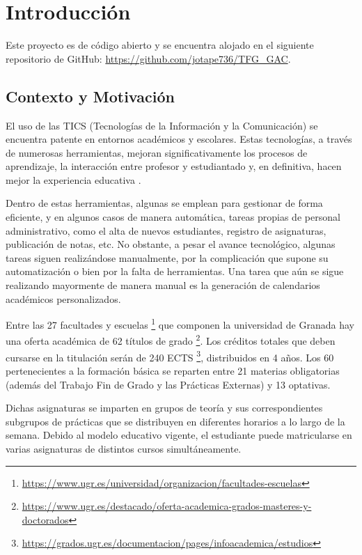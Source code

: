 \chapter{Introducción}

Este proyecto es de código abierto y se encuentra alojado en el siguiente repositorio de GitHub: \url{https://github.com/jotape736/TFG_GAC}.

\section{Contexto y Motivación}
El uso de las TICS (Tecnologías de la Información y la Comunicación) se encuentra patente en entornos académicos y escolares. Estas tecnologías, a través de numerosas herramientas, mejoran significativamente los procesos de aprendizaje, la interacción entre profesor y estudiantado y, en definitiva, hacen mejor la experiencia educativa \cite{Flores-Alarcia2012,Paladines,TICenLaEducacion}.\newline

Dentro de estas herramientas, algunas se emplean para gestionar de forma eficiente, y en algunos casos de manera automática, tareas propias de personal administrativo, como el alta de nuevos estudiantes, registro de asignaturas, publicación de notas, etc. No obstante, a pesar el avance tecnológico, algunas tareas siguen realizándose manualmente, por la complicación que supone su automatización o bien por la falta de herramientas. Una tarea que aún se sigue realizando mayormente de manera manual es la generación de calendarios académicos personalizados.\newline

Entre las 27 facultades y escuelas \footnote[1]{\url{https://www.ugr.es/universidad/organizacion/facultades-escuelas}} que componen la universidad de Granada hay una oferta académica de 62 títulos de grado \footnote[2]{\url{https://www.ugr.es/destacado/oferta-academica-grados-masteres-y-doctorados}}. Los créditos totales que deben cursarse en la titulación serán de 240 ECTS \footnote[3]{\url{https://grados.ugr.es/documentacion/pages/infoacademica/estudios}}, distribuidos en 4 años. Los 60 pertenecientes a la formación básica se reparten entre 21 materias obligatorias (además del Trabajo Fin de Grado y las Prácticas Externas) y 13 optativas.\newline

Dichas asignaturas se imparten en grupos de teoría y sus correspondientes subgrupos de prácticas que se distribuyen en diferentes horarios a lo largo de la semana. Debido al modelo educativo vigente, el estudiante puede matricularse en varias asignaturas de distintos cursos simultáneamente.\newline

